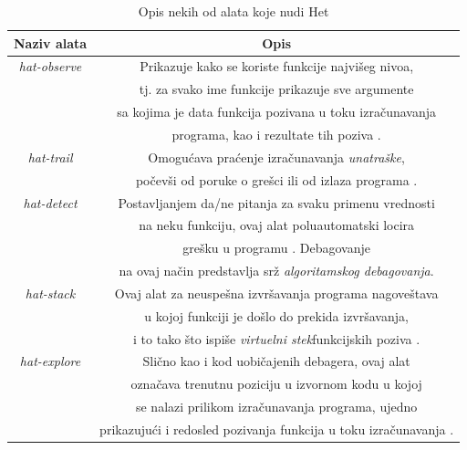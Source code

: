 \documentclass[a4paper]{article}
\begin{document}
\begin{table}[h!]
\begin{center}
\caption{Opis nekih od alata koje nudi Het}
\begin{tabular}{|c|c|} \hline
Naziv alata & Opis\\ \hline
{\em hat-observe} & { Prikazuje kako se koriste funkcije najvišeg nivoa, } \\ & 
		    { tj. za svako ime funkcije prikazuje sve argumente } \\ & 
		    { sa kojima je data funkcija pozivana u toku izračunavanja }\\ & 
		    { programa, kao i rezultate tih poziva \cite{hat_haskell_org}.}\\ \hline
{\em hat-trail} & { Omogućava praćenje izračunavanja {\em unatraške}, } \\ & 
		  { počevši od poruke o grešci ili od izlaza programa \cite{hat_haskell_org}.}\\ \hline
{\em hat-detect} & { Postavljanjem da/ne pitanja za svaku primenu vrednosti  } \\ &
		   { na neku funkciju, ovaj alat poluautomatski locira } \\ &
		   { grešku u programu \cite{hat_haskell_org}. Debagovanje } \\ &
		   { na ovaj način predstavlja srž {\em algoritamskog debagovanja}. }\\ \hline
{\em hat-stack} & { Ovaj alat za neuspešna izvršavanja programa nagoveštava } \\ & 
		  { u kojoj funkciji je došlo do prekida izvršavanja, } \\ & 
		  { i to tako što ispiše {\em virtuelni stek}\footnotemark[1] funkcijskih poziva \cite{hat_haskell_org}. }\\ \hline %
{\em hat-explore} & { Slično kao i kod uobičajenih debagera, ovaj alat }\\ &
		    { označava trenutnu poziciju u izvornom kodu u kojoj } \\ &
		    { se nalazi prilikom izračunavanja programa, ujedno} \\ &
		    { prikazujući i redosled pozivanja funkcija u toku izračunavanja \cite{hat_haskell_org}.} \\ \hline
\end{tabular}
\label{tab:tabela_hat}
\end{center}
\end{table}

\end{document}
